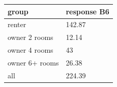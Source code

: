 \begingroup\small
\setlength{\tabcolsep}{3pt}
\renewcommand{\arraystretch}{1.04}
\begin{tabularx}{\linewidth}{XX}
\toprule
group & response B6 \\
\midrule
renter & 142.87 \\
owner 2 rooms & 12.14 \\
owner 4 rooms & 43 \\
owner 6+ rooms & 26.38 \\
all & 224.39 \\
\bottomrule
\end{tabularx}
\endgroup
